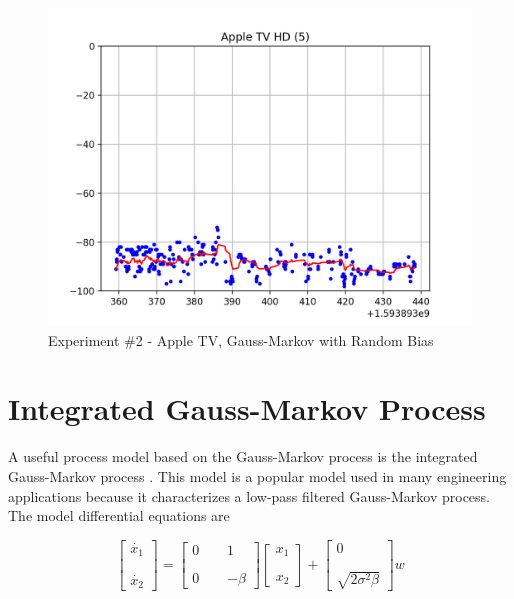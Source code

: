 \documentclass[12pt]{article}
\begin{document}
\begin{figure}[ht]
    \centering
    \includegraphics[width=1.0\textwidth]{Experiment-2-ATV-GMRB.png}
    \caption{Experiment \#2 - Apple TV, Gauss-Markov with Random Bias}
    \label{fig:experiment-2-atv-gmrb}
\end{figure}



%
%

\clearpage
\section{Integrated Gauss-Markov Process}

A useful process model based on the Gauss-Markov process is the integrated Gauss-Markov
process \cite{rgbrown1983}. This model is a popular model used in many engineering
applications because it characterizes a low-pass filtered Gauss-Markov process. The model
differential equations are

\begin{equation}
    \begin{bmatrix}
    \dot{x_1} \\
    \phantom{m} \\
    \dot{x_2}
    \end{bmatrix}
    =
    \begin{bmatrix}
    0 & & 1 \\
    \phantom{m} \\
    0 & & -\beta
    \end{bmatrix}
    \begin{bmatrix}
    x_1 \\
    \phantom{m} \\
    x_2
    \end{bmatrix}
    +
    \begin{bmatrix}
    0 \\
    \phantom{m} \\
    \sqrt{2 \sigma^2 \beta}
    \end{bmatrix}
    w
    \label{eq:IGM-differential-system}
\end{equation}
\end{document}
